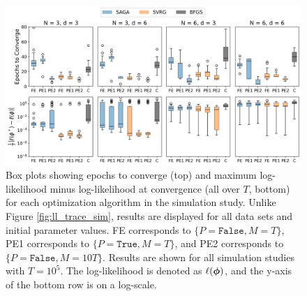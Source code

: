 \begin{figure}%
    \centering
    \includegraphics[width=6.5in]{../plt/boxplots_sim_T_100000.png}
    \caption{Box plots showing epochs to converge (top) and maximum log-likelihood minus log-likelihood at convergence (all over $T$, bottom) for each optimization algorithm in the simulation study. Unlike Figure \ref{fig:ll_trace_sim}, results are displayed for all data sets and initial parameter values. FE corresponds to $\{P = \texttt{False}, M = T\}$, PE1 corresponds to $\{P = \texttt{True}, M = T\}$, and PE2 corresponds to $\{P = \texttt{False}, M = 10T\}$. %
    Results are shown for all simulation studies with $T=10^{5}$. %
    The log-likelihood is denoted as $\ell(\boldsymbol{\phi})$, and the y-axis of the bottom row is on a log-scale.}
    \label{fig:boxplots_sim}
\end{figure}
%
